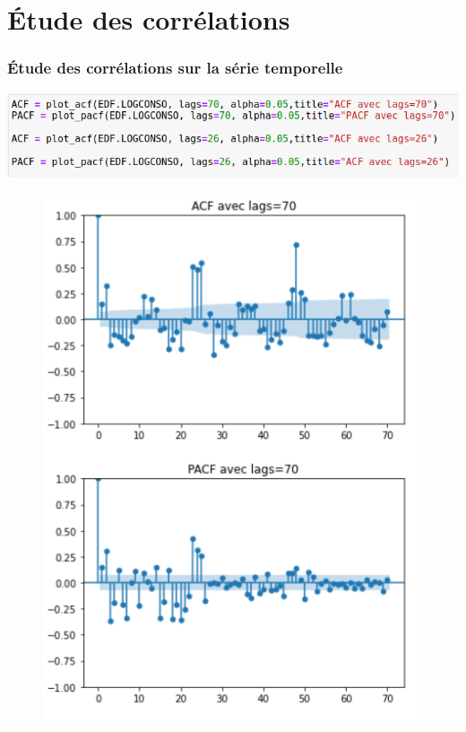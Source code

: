 \documentclass{beamer}
\theoremstyle{definition}
\begin{document}
\section{Étude des corrélations}

\begin{frame}
	\frametitle{Étude des corrélations sur la série temporelle}
	\begin{minipage}[t]{1\linewidth}
		\centering
		\includegraphics[width=0.8\linewidth]{10.png}
		\begin{minipage}[c]{0.48\linewidth}\centering\begin{figure}
				\centering
				\includegraphics[width=0.75\linewidth]{11.png}	
		\end{figure}\end{minipage}\hfill 
		\begin{minipage}[c]{0.48\linewidth}\centering\begin{figure}
				\begin{center}

\end{center}
\end{figure}
\end{minipage}
\end{minipage}
\end{frame}
\end{document}
